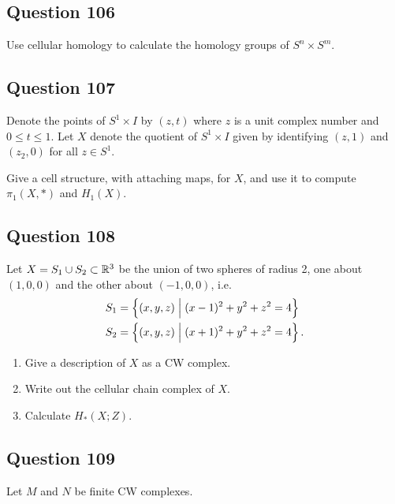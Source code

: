\documentclass[12pt]{article}
\begin{document}
\hypertarget{question-106-2}{%
\subsection{Question 106}\label{question-106-2}}

Use cellular homology to calculate the homology groups of
\(S^n \times S^m\).

\hypertarget{question-107-2}{%
\subsection{Question 107}\label{question-107-2}}

Denote the points of \(S^1 \times I\) by \((z, t)\) where \(z\) is a
unit complex number and \(0 \leq t \leq 1\). Let \(X\) denote the
quotient of \(S^1 \times I\) given by identifying \((z, 1)\) and
\((z_2 , 0)\) for all \(z \in S^1\).

Give a cell structure, with attaching maps, for \(X\), and use it to
compute \(\pi_1 (X, \ast)\) and \(H_1 (X)\).

\hypertarget{question-108-2}{%
\subsection{Question 108}\label{question-108-2}}

Let \(X = S_1 \cup S_2 \subset {\mathbb{R}}^3\) be the union of two spheres of
radius 2, one about \((1, 0, 0)\) and the other about \((-1, 0, 0)\),
i.e.~ \begin{align*}
S_1 &= \left\{{(x, y,z) \mathrel{\Big|} (x-1)^2 + y^2 +z^2 = 4}\right\} \\
S_2 &= \left\{{(x, y, z) \mathrel{\Big|} (x + 1)^2 + y^2 + z^2 = 4}\right\}
.\end{align*}

\begin{enumerate}
\def\labelenumi{\alph{enumi}.}
\item
  Give a description of \(X\) as a CW complex.
\item
  Write out the cellular chain complex of \(X\).
\item
  Calculate \(H_* (X; Z)\).
\end{enumerate}

\hypertarget{question-109-2}{%
\subsection{Question 109}\label{question-109-2}}

Let \(M\) and \(N\) be finite CW complexes.
\end{document}
